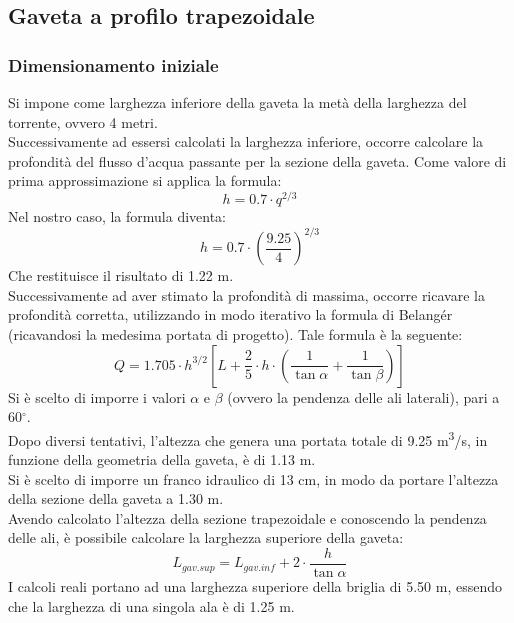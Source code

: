 \subsection{Gaveta a profilo trapezoidale}

\subsubsection{Dimensionamento iniziale}
Si impone come larghezza inferiore della gaveta la metà della larghezza del torrente, ovvero 4 metri.\\
Successivamente ad essersi calcolati la larghezza inferiore, occorre calcolare la profondità del flusso d'acqua passante per la sezione della gaveta. Come valore di prima approssimazione si applica la formula:
\begin{equation}
    h = 0.7 \cdot q ^{2/3}
\end{equation}
Nel nostro caso, la formula diventa:
\begin{equation}
    h = 0.7 \cdot \left( \frac{9.25}{4} \right)^{2/3}
\end{equation}
Che restituisce il risultato di 1.22 m.\\
Successivamente ad aver stimato la profondità di massima, occorre ricavare la profondità corretta, utilizzando in modo iterativo la formula di Belangér (ricavandosi la medesima portata di progetto). Tale formula è la seguente:
\begin{equation}
Q = 1.705 \cdot h^{3/2} \left[L + \frac{2}{5}\cdot h \cdot \left(\frac{1}{\tan{\alpha}} + \frac{1}{\tan{\beta}}\right) \right]
\end{equation}
Si è scelto di imporre i valori $\alpha$ e $\beta$ (ovvero la pendenza delle ali laterali), pari a 60$^\circ$.\\
Dopo diversi tentativi, l'altezza che genera una portata totale di 9.25 \unit{m^3/s}, in funzione della geometria della gaveta, è di 1.13 m.\\
Si è scelto di imporre un franco idraulico di 13 cm, in modo da portare l'altezza della sezione della gaveta a 1.30 m.\\
Avendo calcolato l'altezza della sezione trapezoidale e conoscendo la pendenza delle ali, è possibile calcolare la larghezza superiore della gaveta:
\begin{equation}
    L_{gav.sup} = L_{gav.inf} + 2 \cdot \frac{h}{\tan \alpha} 
\end{equation}
I calcoli reali portano ad una larghezza superiore della briglia di 5.50 m, essendo che la larghezza di una singola ala è di 1.25 m.\\
